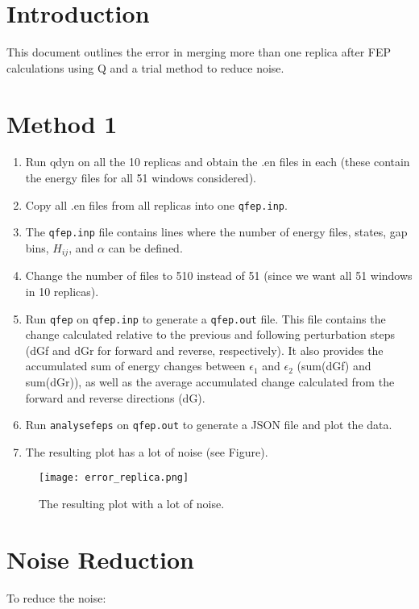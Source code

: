 \documentclass{article}
\begin{document}
\section{Introduction}
This document outlines the error in merging more than one replica after FEP calculations using Q and a trial method to reduce noise.

\section{Method 1}

\begin{enumerate}
    \item Run qdyn on all the 10 replicas and obtain the .en files in each (these contain the energy files for all 51 windows considered).
    \item Copy all .en files from all replicas into one \texttt{qfep.inp}.
    \item The \texttt{qfep.inp} file contains lines where the number of energy files, states, gap bins, \(H_{ij}\), and \(\alpha\) can be defined.
    \item Change the number of files to 510 instead of 51 (since we want all 51 windows in 10 replicas).
    \item Run \texttt{qfep} on \texttt{qfep.inp} to generate a \texttt{qfep.out} file. This file contains the change calculated relative to the previous and following perturbation steps (dGf and dGr for forward and reverse, respectively). It also provides the accumulated sum of energy changes between \(\epsilon_1\) and \(\epsilon_2\) (sum(dGf) and sum(dGr)), as well as the average accumulated change calculated from the forward and reverse directions (dG).
    \item Run \texttt{analysefeps} on \texttt{qfep.out} to generate a JSON file and plot the data.
    \item The resulting plot has a lot of noise (see Figure).
\end{enumerate}

\begin{figure}[h] %
    \centering
    \texttt{[image: error\_replica.png]} %
    \caption{The resulting plot with a lot of noise.}
    \label{fig:noise}
\end{figure}

\section{Noise Reduction}
To reduce the noise:
\end{document}
